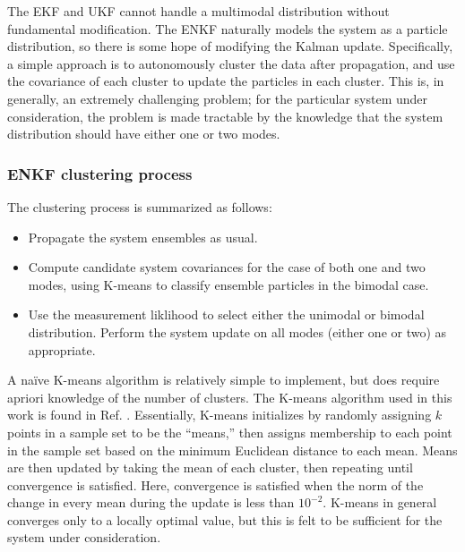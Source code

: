 \documentclass[]{article}
\begin{document}
The EKF and UKF cannot handle a multimodal distribution without fundamental modification. The ENKF naturally models the system as a particle distribution, so there is some hope of modifying the Kalman update. Specifically, a simple approach is to autonomously cluster the data after propagation, and use the covariance of each cluster to update the particles in each cluster. This is, in generally, an extremely challenging problem; for the particular system under consideration, the problem is made tractable by the knowledge that the system distribution should have either one or two modes.

\subsubsection{ENKF clustering process}

The clustering process is summarized as follows:

\begin{itemize}
\item Propagate the system ensembles as usual.
\item Compute candidate system covariances for the case of both one and two modes, using K-means to classify ensemble particles in the bimodal case.
\item Use the measurement liklihood to select either the unimodal or bimodal distribution. Perform the system update on all modes (either one or two) as appropriate.
\end{itemize}

A na\"{i}ve K-means algorithm is relatively simple to implement, but does require apriori knowledge of the number of clusters. The K-means algorithm used in this work is found in Ref. \cite{mackay2003}. Essentially, K-means initializes by randomly assigning $k$ points in a sample set to be the ``means,'' then assigns membership to each point in the sample set based on the minimum Euclidean distance to each mean. Means are then updated by taking the mean of each cluster, then repeating until convergence is satisfied. Here, convergence is satisfied when the norm of the change in every mean during the update is less than $10^{-2}$. K-means in general converges only to a locally optimal value, but this is felt to be sufficient for the system under consideration.
\end{document}
